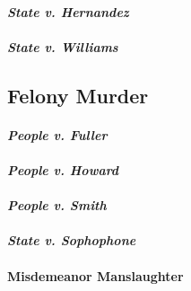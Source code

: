 \paragraph{\emph{State v. Hernandez}}

\paragraph{\emph{State v. Williams}}

\subsection{Felony Murder}

\paragraph{\emph{People v. Fuller}}

\paragraph{\emph{People v. Howard}}

\paragraph{\emph{People v. Smith}}

\paragraph{\emph{State v. Sophophone}}

\paragraph{Misdemeanor Manslaughter}

